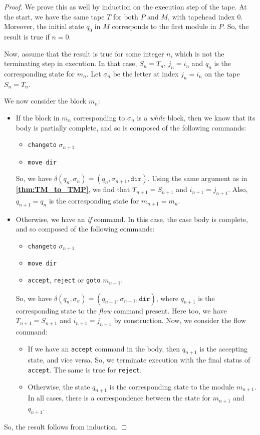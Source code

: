 \documentclass{article}
\theoremstyle{definition}
\theoremstyle{plain}
\begin{document}
\begin{proof}
    We prove this as well by induction on the execution step of the tape. At the start, we have the same tape $T$ for both $P$ and $M$, with tapehead index $0$. Moreover, the initial state $q_0$ in $M$ corresponds to the first module in $P$. So, the result is true if $n = 0$. 
    
    Now, assume that the result is true for some integer $n$, which is not the terminating step in execution. In that case, $S_n = T_n$, $j_n = i_n$ and $q_n$ is the corresponding state for $m_n$. Let $\sigma_n$ be the letter at index $j_n = i_n$ on the tape $S_n = T_n$. 
    
    We now consider the block $m_n$:
    \begin{itemize}
        \item If the block in $m_n$ corresponding to $\sigma_n$ is a \textit{while} block, then we know that its body is partially complete, and so is composed of the following commands:
        \begin{itemize}
            \item \texttt{changeto} $\sigma_{n+1}$
            \item \texttt{move dir}
        \end{itemize}
        So, we have $\delta(q_n, \sigma_n) = (q_n, \sigma_{n+1}, \texttt{dir})$. Using the same argument as in \textbf{\ref{thm:TM_to_TMP}}, we find that $T_{n+1} = S_{n+1}$ and $i_{n+1} = j_{n+1}$. Also, $q_{n+1} = q_n$ is the corresponding state for $m_{n+1} = m_n$. 
        
        \item Otherwise, we have an \textit{if} command. In this case, the case body is complete, and so composed of the following commands:
        \begin{itemize}
            \item \texttt{changeto} $\sigma_{n+1}$
            \item \texttt{move dir}
            \item \texttt{accept}, \texttt{reject} or \texttt{goto} $m_{n+1}$.
        \end{itemize}
        So, we have $\delta(q_n, \sigma_n) = (q_{n+1}, \sigma_{n+1}, \texttt{dir})$, where $q_{n+1}$ is the corresponding state to the \textit{flow} command present. Here too, we have $T_{n+1} = S_{n+1}$ and $i_{n+1} = j_{n+1}$ by construction. Now, we consider the flow command:
        \begin{itemize}
            \item If we have an \texttt{accept} command in the body, then $q_{n+1}$ is the accepting state, and vice versa. So, we terminate execution with the final status of \texttt{accept}. The same is true for \texttt{reject}. 
            \item Otherwise, the state $q_{n+1}$ is the corresponding state to the module $m_{n+1}$. In all cases, there is a correspondence between the state for $m_{n+1}$ and $q_{n+1}$.
        \end{itemize}
    \end{itemize}
    So, the result follows from induction.
\end{proof}
\end{document}
